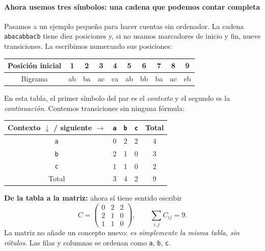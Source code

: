 \paragraph{Ahora usemos tres símbolos: una cadena que podemos contar completa}
Pasamos a un ejemplo pequeño para hacer cuentas sin ordenador. La cadena \texttt{abacabbacb} tiene diez posiciones y, si no usamos marcadores de inicio y fin, nueve transiciones. La escribimos numerando sus posiciones:
\begin{center}
\end{center}
\begin{center}
\begin{tabular}{c|ccccccccc}\toprule
Posición inicial &1&2&3&4&5&6&7&8&9\\\midrule
Bigrama & ab&ba&ac&ca&ab&bb&ba&ac&cb\\\bottomrule
\end{tabular}
\end{center}
En esta tabla, el primer símbolo del par es el \emph{contexto} y el segundo es la \emph{continuación}. Contemos transiciones sin ninguna fórmula:
\begin{center}
\begin{tabular}{c|ccc|c}\toprule
Contexto $\downarrow$ / siguiente $\to$ & \texttt{a}&\texttt{b}&\texttt{c}&Total\\\midrule
\texttt{a}&0&2&2&4\\
\texttt{b}&2&1&0&3\\
\texttt{c}&1&1&0&2\\\midrule
Total&3&4&2&9\\\bottomrule
\end{tabular}
\end{center}
\textbf{De la tabla a la matriz:} ahora sí tiene sentido escribir
\[
C=\begin{pmatrix}0&2&2\\2&1&0\\1&1&0\end{pmatrix},
\qquad\sum_{i,j}C_{ij}=9.
\]
La matriz no añade un concepto nuevo: \emph{es simplemente la misma tabla, sin rótulos}. Las filas y columnas se ordenan como \texttt{a}, \texttt{b}, \texttt{c}.

